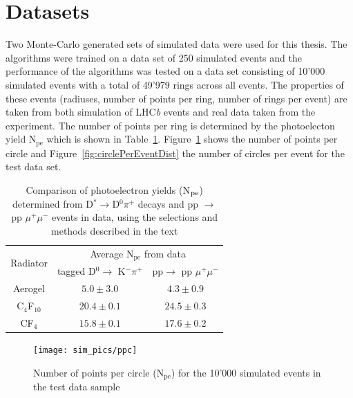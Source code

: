 \documentclass[11pt]{scrreprt}
\begin{document}

\section{Datasets} %
\label{sec:dataset}
Two Monte-Carlo generated sets of simulated data were used for this thesis. The algorithms were trained on a data set of 250 simulated events and the performance of the algorithms was tested on a data set consisting of 10'000 simulated events with a total of 49'979 rings across all events. The properties of these events (radiuses, number of points per ring, number of rings per event) are taken from both simulation of LHC\textit{b} events and
real data taken from the experiment. The number of points per ring is determined by the photoelecton yield N$_\text{pe}$ which is shown in Table~\ref{tab:results}. Figure~\ref{fig:ppc1} shows the number of points per circle and Figure~\ref{fig:circlePerEventDist} the number of circles per event for the test data set.

\begin{table}[tb]
\centering
\begin{tabular}{c c c}
\toprule
\multirow{2}{*}{Radiator} & \multicolumn{2}{c}{Average N$_{\text{pe}}$ from data} \\
\cmidrule{2-3} &  tagged D$^0 \rightarrow$ K$^- \pi^+$ &pp$ \rightarrow$ pp $\mu^+ \mu^-$ \\
\midrule
Aerogel & $5.0 \pm 3.0$  & $4.3 \pm 0.9$\\
C$_4$F$_{10}$  & $20.4 \pm 0.1$ & $24.5 \pm 0.3$ \\
CF$_4$ & $ 15.8 \pm 0.1$  & $ 17.6 \pm 0.2$ \\ 
\bottomrule
\end{tabular}
\caption[Comparison of photoelectron yields (N$_{\rm pe}$)]{Comparison of photoelectron yields (N$_{\rm pe}$) determined from
D$^* \rightarrow$D$^0\pi^+$ decays and pp $\rightarrow$ pp $\mu^+ \mu^-$ events in data, using the selections and 
methods described in the text \cite{RICHPerf2012}}
\label{tab:results}
\end{table}

\begin{figure}[tb]
  \centering
  \texttt{[image: sim\_pics/ppc]}
  \caption{Number of points per circle (N$_\text{pe}$) for the 10'000 simulated events in the test data sample}
  \label{fig:ppc1}
\end{figure}
\end{document}
